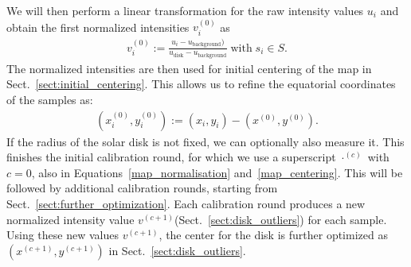 \documentclass{aa}
\newcommand{\eqnl}[2]{\begin{eqnarray}\label{#1}#2\end{eqnarray}}
\newcommand{\s}[2]{{#1}_{\mathrm{#2}}}
\begin{document}

  We will then perform a linear 
  transformation for the raw intensity values $u_i$ and obtain the first normalized intensities $v_i^{(0)}$ as
  \eqnl{map_normalisation}{
  v_i^{(0)} := \frac{u_i - \s{u}{background})}{\s{u}{disk} - \s{u}{background}} \; \text{with} \; s_i \in S \text{.}
  }
  The normalized intensities are then used for initial centering of the map in Sect.~\ref{sect:initial_centering}. 
  This allows us to refine the equatorial coordinates of the samples as:
  \eqnl{map_centering}{
  \left( x_i^{(0)}, y_i^{(0)} \right) := \left( x_i, y_i \right) - \left( x^{(0)}, y^{(0)} \right) \text{.}
  }
  If the radius of the solar disk is not fixed, we can optionally also measure it. This finishes the initial calibration 
  round, for which we use a superscript $\cdot^{(c)}$ with $c=0$, also in Equations~\ref{map_normalisation} 
  and~\ref{map_centering}. This will be followed by additional calibration rounds, starting from 
  Sect.~\ref{sect:further_optimization}. Each calibration round produces a new normalized intensity value 
  $v^{(c+1)}$(Sect.~\ref{sect:disk_outliers}) for each sample. Using these new values $v^{(c+1)}$, the center for the 
  disk is further optimized as $(x^{(c+1)}, y^{(c+1)})$ in Sect.~\ref{sect:disk_outliers}.
\end{document}
